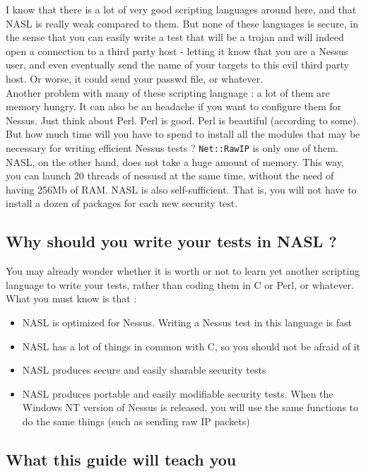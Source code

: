 \documentclass{article}
\begin{document}
I know that there is a lot of very good scripting languages around
here, and that NASL is really weak compared to them. But none of
these languages is secure, in the sense that you can easily write
a test that will be a trojan and will indeed open a connection to
a third party host - letting it know that you are a Nessus user, 
and even eventually send the name of your targets to this evil
third party host. Or worse, it could send your passwd file, or
whatever.\\

Another problem with many of these scripting language : a lot of
them are memory hungry. It can also be an headache if you want to
configure them for Nessus. Just think about Perl. Perl is good.
Perl is beautiful (according to some). But how much time will you
have to spend to install all the modules that may be necessary for
writing efficient Nessus tests ? \verb+Net::RawIP+ is only one of them.\\

NASL, on the other hand, does not take a huge amount of memory. This
way, you can launch 20 threads of nessusd at the same time, without
the need of having 256Mb of RAM. NASL is also self-sufficient. That
is, you will not have to install a dozen of packages for each new
security test. 

\subsection{Why should you write your tests in NASL ?}

You may already wonder whether it is worth or not to learn yet 
another scripting language to write your tests, rather than
coding them in C or Perl, or whatever. What you must know
is that :
\begin{itemize}
\item NASL is optimized for Nessus. Writing a Nessus test in this
language is fast
\item NASL has a lot of things in common with C, so you should not
be afraid of it
\item NASL produces secure and easily sharable security tests
\item NASL produces portable and easily modifiable security tests. When
the Windows NT version of Nessus is released, you will use the same
functions to do the same things (such as sending raw IP packets)
\end{itemize}



\subsection{What this guide will teach you}
\end{document}
